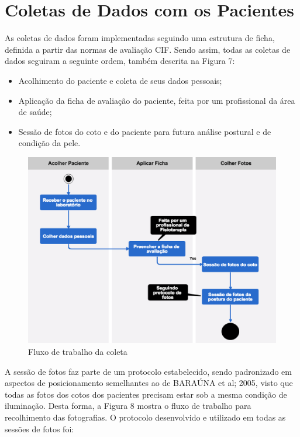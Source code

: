 \section{Coletas de Dados com os Pacientes}

    As coletas de dados foram implementadas seguindo uma estrutura de ficha, definida a partir das normas de avaliação CIF. Sendo assim, todas as coletas de dados seguiram a seguinte ordem, também descrita na Figura 7:

    \begin{itemize}
        \item Acolhimento do paciente e coleta de seus dados pessoais;
        \item Aplicação da ficha de avaliação do paciente, feita por um profissional da área de saúde;
        \item Sessão de fotos do coto e do paciente para futura análise postural e de condição da pele.
    \end{itemize}

    \begin{figure}[ht]
        \centering
        \label{fig07}
            \includegraphics[keepaspectratio=true, scale=0.4]{editaveis/images/colet_flow.eps}
        \caption{Fluxo de trabalho da coleta}
    \end{figure}

    A sessão de fotos faz parte de um protocolo estabelecido, sendo padronizado em aspectos de posicionamento semelhantes ao de BARAÚNA et al; 2005, visto que todas as fotos dos cotos dos pacientes precisam estar sob a mesma condição de iluminação. Desta forma, a Figura 8 mostra o fluxo de trabalho para recolhimento das fotografias. O protocolo desenvolvido e utilizado em todas as sessões de fotos foi:

